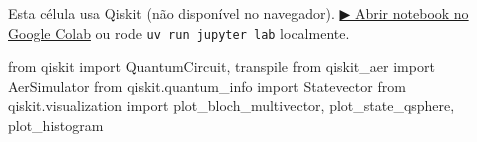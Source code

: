\documentclass[
  brazilian,
]{report}
\newenvironment{Shaded}{\begin{snugshade}}{\end{snugshade}}
\newcommand{\ImportTok}[1]{\textcolor[rgb]{0.00,0.46,0.62}{#1}}
\newcommand{\NormalTok}[1]{\textcolor[rgb]{0.00,0.23,0.31}{#1}}
\begin{document}
\begin{tcolorbox}[enhanced jigsaw, arc=.35mm, bottomrule=.15mm, bottomtitle=1mm, breakable, colback=white, colbacktitle=quarto-callout-warning-color!10!white, colframe=quarto-callout-warning-color-frame, coltitle=black, left=2mm, leftrule=.75mm, opacityback=0, opacitybacktitle=0.6, rightrule=.15mm, title=\textcolor{quarto-callout-warning-color}{\faExclamationTriangle}\hspace{0.5em}{⚛️ Célula Qiskit --- execute no Colab ou localmente}, titlerule=0mm, toprule=.15mm, toptitle=1mm]

Esta célula usa Qiskit (não disponível no navegador).
\href{https://colab.research.google.com/github/maxwellamaral/aula-quantum/blob/main/notebooks/05-interference.ipynb}{▶
Abrir notebook no Google Colab} ou rode \texttt{uv\ run\ jupyter\ lab}
localmente.

\begin{Shaded}
\begin{Highlighting}[]

\ImportTok{from}\NormalTok{ qiskit }\ImportTok{import}\NormalTok{ QuantumCircuit, transpile}
\ImportTok{from}\NormalTok{ qiskit\_aer }\ImportTok{import}\NormalTok{ AerSimulator}
\ImportTok{from}\NormalTok{ qiskit.quantum\_info }\ImportTok{import}\NormalTok{ Statevector}
\ImportTok{from}\NormalTok{ qiskit.visualization }\ImportTok{import}\NormalTok{ plot\_bloch\_multivector, plot\_state\_qsphere, plot\_histogram}
\end{Highlighting}
\end{Shaded}

\end{tcolorbox}
\end{document}
